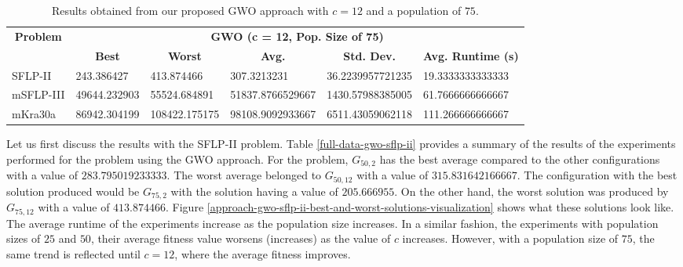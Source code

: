 \begin{table}[h!]
	\begin{adjustwidth}{-1.18in}{}
		\centering
		\begin{tabular}{|l|l|l|l|l|l|}
			\hline
			\multicolumn{1}{|c|}{\multirow{2}{*}{\textbf{Problem}}} & \multicolumn{5}{c|}{\textbf{GWO (c = 12, Pop. Size of 75)}} \\ \cline{2-6} 
			\multicolumn{1}{|c|}{}                                  & \multicolumn{1}{c|}{\textbf{Best}} & \multicolumn{1}{c|}{\textbf{Worst}} & \multicolumn{1}{c|}{\textbf{Avg.}} & \multicolumn{1}{c|}{\textbf{Std. Dev.}} & \multicolumn{1}{c|}{\textbf{Avg. Runtime (s)}} \\ \hline
			SFLP-II                                                 & 243.386427                                  & 413.874466                                   & 307.3213231                      & 36.2239957721235                                 & 19.3333333333333                                  \\ \hline
			mSFLP-III                                               & 49644.232903                                & 55524.684891                                 & 51837.8766529667						         & 1430.57988385005                              & 61.7666666666667                              \\ \hline
			mKra30a                                               & 86942.304199                                & 108422.175175                                 &
			98108.9092933667							&
			6511.43059062118							&
			111.266666666667						\\ \hline
		\end{tabular}
	\end{adjustwidth}
	\caption{Results obtained from our proposed GWO approach with $c = 12$ and a population of $75$.}
	\label{approach-gwo-c12-p75-results}
\end{table}

Let us first discuss the results with the SFLP-II problem. Table \ref{full-data-gwo-sflp-ii} provides a summary of the results of the experiments performed for the problem using the GWO approach. For the problem, $G_{50,2}$ has the best average compared to the other configurations with a value of $283.795019233333$. The worst average belonged to $G_{50,12}$ with a value of $315.831642166667$. The configuration with the best solution produced would be $G_{75,2}$ with the solution having a value of $205.666955$. On the other hand, the worst solution was produced by $G_{75,12}$ with a value of $413.874466$. Figure \ref{approach-gwo-sflp-ii-best-and-worst-solutions-visualization} shows what these solutions look like. The average runtime of the experiments increase as the population size increases. In a similar fashion, the experiments with population sizes of $25$ and $50$, their average fitness value worsens (increases) as the value of $c$ increases. However, with a population size of $75$, the same trend is reflected until $c = 12$, where the average fitness improves.

